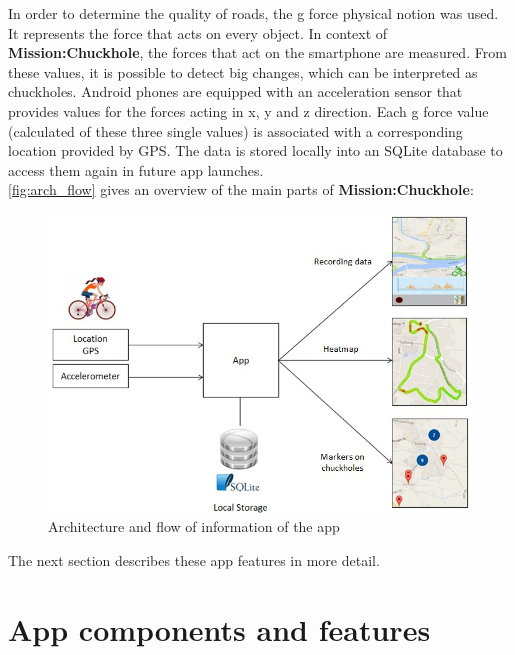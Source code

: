 \documentclass[10pt,a4paper]{article} %
\begin{document}
	In order to determine the quality of roads, the g force physical notion was used. 
	It represents the force that acts on every object. 
	In context of \textbf{Mission:Chuckhole}, the forces that act on the smartphone are measured.
	From these values, it is possible to detect big changes, which can be interpreted as chuckholes.
	Android phones are equipped with an acceleration sensor that provides values for the forces acting in x, y and z direction.
	Each g force value (calculated of these three single values) is associated with a corresponding location provided by GPS.
	The data is stored locally into an SQLite database to access them again in future app launches.\\
	\autoref{fig:arch_flow} gives an overview of the main parts of \textbf{Mission:Chuckhole}:
	
	\begin{figure}[H]
	\centering
    	\includegraphics[scale = 0.8]{pic1}
    	\caption{Architecture and flow of information of the app }
	\label{fig:arch_flow}
    	\end{figure}
    
	\noindent
	The next section describes these app features in more detail.
    
    \section{App components and features}
    
    
\end{document}
